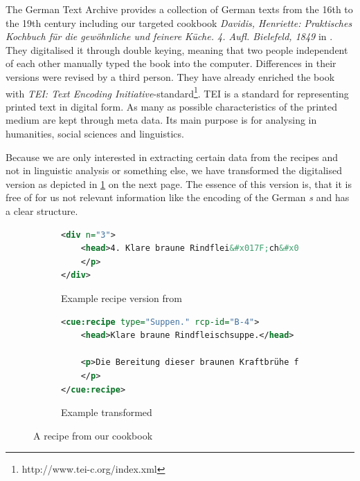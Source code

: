 \documentclass[12pt, twoside]{report}
\newcommand*\longs{{\fontencoding{TS1}\selectfont s}}
\begin{document}
The German Text Archive provides a collection of German texts from the 16th to the 19th century including our targeted cookbook \textit{Davidis, Henriette: Praktisches Kochbuch für die gewöhnliche und feinere Küche. 4. Aufl. Bielefeld, 1849} in \parencite{DTA}. They digitalised it through double keying, meaning that two people independent of each other manually typed the book into the computer. Differences in their versions were revised by a third person. They have already enriched the book with \textit{TEI: Text Encoding Initiative}-standard\footnote{http://www.tei-c.org/index.xml}. TEI is a standard for representing printed text in digital form. As many as possible characteristics of the printed medium are kept through meta data. Its main purpose is for analysing in humanities, social sciences and linguistics.

Because we are only interested in extracting certain data from the recipes and not in linguistic analysis or something else, we have transformed the digitalised version as depicted in \cref{fig:davidisRecipe} on the next page. The essence of this version is, that it is free of for us not relevant information like the encoding of the German \textit{\longs} and has a clear structure. 

\begin{figure}[H]
	\begin{subfigure}{1\textwidth}
	\begin{lstlisting}[language=XML]
<div n="3">
	<head>4. Klare braune Rindflei&#x017F;ch&#x017F;uppe.</head><lb/><p>Die Bereitung die&#x017F;er braunen Kraftbrühe findet man in<lb/> <hi rendition="#aq">A.</hi> No. 12. Zu einer          Ge&#x017F;ell&#x017F;chaft	von 12 Per&#x017F;onen nimmt<lb/> man 6 Pfund Rindflei&#x017F;ch und 1 Pfund rohen Schinken. Es <lb/> werden braune Klöße No. 3 und Schwammklöße darin gemacht.<lb/> Auch kann man nach Belieben braunen Sago darin kochen.
	</p>
</div>
	\end{lstlisting}\caption{Example recipe version from \parencite{DTA}}\vspace{1em}
	\end{subfigure}
	\begin{subfigure}{1\textwidth}
\begin{lstlisting}[language=XML]
<cue:recipe type="Suppen." rcp-id="B-4">
	<head>Klare braune Rindfleischsuppe.</head>
	
	<p>Die Bereitung dieser braunen Kraftbrühe findet man in A. No. 12. Zu einer Gesellschaft von 12 Personen nimmt man 6 Pfund Rindfleisch und 1 Pfund rohen Schinken. Es werden braune Klöße No. 3 und Schwammklöße darin gemacht. Auch kann man nach Belieben braunen Sago darin kochen.
	</p>
</cue:recipe>
\end{lstlisting}\caption{Example transformed}
	\end{subfigure}
	\caption{A recipe from our cookbook}
	\label{fig:davidisRecipe}
\end{figure}
\end{document}
